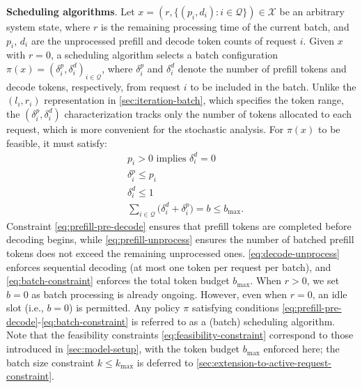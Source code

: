 \documentclass[11pt]{article}
\theoremstyle{plain}
\theoremstyle{definition}
\theoremstyle{remark}
\begin{document}
\textbf{Scheduling algorithms}. Let \( x = (r, \{(p_i, d_i) : i \in \mathcal{Q} \}) \in \mathcal{X} \) be an arbitrary system state, where $r$ is the remaining processing time of the current batch, and $p_i$, $d_i$ are the unprocessed prefill and decode token counts of request $i$. Given \( x \) with \( r = 0 \), a scheduling algorithm selects a batch configuration \(\pi(x) = (\delta_i^p, \delta_i^d)_{i \in \mathcal{Q}}\), where \( \delta_i^p \) and \( \delta_i^d \) denote the number of prefill tokens and decode tokens, respectively, from request \( i \) to be included in the batch. Unlike the $(l_i, r_i)$ representation in \cref{sec:iteration-batch}, which specifies the token range, the $(\delta_i^p, \delta_i^d)$ characterization tracks only the number of tokens allocated to each request, which is more convenient for the stochastic analysis. For \( \pi(x) \) to be feasible, it must satisfy:  
\begin{subequations}\label{eq:feasibility-constraint}
\begin{align}
    & p_{i} > 0 \text{ implies } \delta_{i}^{d} = 0 \label{eq:prefill-pre-decode}\\
    & \delta_{i}^{p}  \leq p_{i} \label{eq:prefill-unprocess} \\ 
    & \delta_{i}^{d} \leq 1  \label{eq:decode-unprocess}\\
    & \sum_{i \in \mathcal{Q}} \Big(\delta_{i}^{d} + \delta_{i}^{p}\Big) = b \leq b_{\max}. \label{eq:batch-constraint}
\end{align}
\end{subequations}
Constraint \cref{eq:prefill-pre-decode} ensures that prefill tokens are completed before decoding begins, while \cref{eq:prefill-unprocess} ensures the number of batched prefill tokens does not exceed the remaining unprocessed ones. \cref{eq:decode-unprocess} enforces sequential decoding (at most one token per request per batch), and \cref{eq:batch-constraint} enforces the total token budget \(b_{\max}\). When \( r > 0 \), we set \( b = 0 \) as batch processing is already ongoing. However, even when \( r = 0 \), an idle slot (i.e., \( b = 0 \)) is permitted. Any policy \(\pi\) satisfying conditions 
\cref{eq:prefill-pre-decode}-\cref{eq:batch-constraint} is referred to as a (batch) scheduling algorithm. Note that the feasibility constraints \cref{eq:feasibility-constraint} correspond to those introduced in \cref{sec:model-setup}, with the token budget $b_{\max}$ enforced here; the batch size constraint $k \le k_{\max}$ is deferred to \cref{sec:extension-to-active-request-constraint}.
\end{document}
